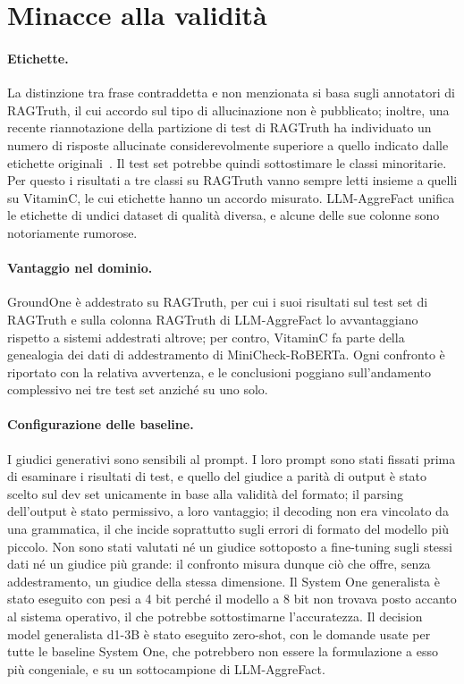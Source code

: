 \section{Minacce alla validità}
\label{sec:disc-threats}

\paragraph{Etichette.} La distinzione tra frase contraddetta e non menzionata si basa sugli annotatori di RAGTruth, il
cui accordo sul tipo di allucinazione non è pubblicato; inoltre, una recente riannotazione della partizione di test di
RAGTruth ha individuato un numero di risposte allucinate considerevolmente superiore a quello indicato dalle etichette
originali~\cite{yu2026retromorphic}. Il test set potrebbe quindi sottostimare le classi minoritarie. Per questo i
risultati a tre classi su RAGTruth vanno sempre letti insieme a quelli su VitaminC, le cui etichette hanno un accordo
misurato. LLM-AggreFact unifica le etichette di undici dataset di qualità diversa, e alcune delle sue colonne sono
notoriamente rumorose.

\paragraph{Vantaggio nel dominio.} GroundOne è addestrato su RAGTruth, per cui i suoi risultati sul test set di RAGTruth e
sulla colonna RAGTruth di LLM-AggreFact lo avvantaggiano rispetto a sistemi addestrati altrove; per contro, VitaminC fa
parte della genealogia dei dati di addestramento di MiniCheck-RoBERTa. Ogni confronto è riportato con la relativa
avvertenza, e le conclusioni poggiano sull'andamento complessivo nei tre test set anziché su uno solo.

\paragraph{Configurazione delle baseline.} I giudici generativi sono sensibili al prompt. I loro prompt sono stati
fissati prima di esaminare i risultati di test, e quello del giudice a parità di output è stato scelto sul dev set
unicamente in base alla validità del formato; il parsing dell'output è stato permissivo, a loro vantaggio; il decoding
non era vincolato da una grammatica, il che incide soprattutto sugli errori di formato del modello più piccolo. Non sono
stati valutati né un giudice sottoposto a fine-tuning sugli stessi dati né un giudice più grande: il confronto misura
dunque ciò che offre, senza addestramento, un giudice della stessa dimensione. Il System One generalista è stato eseguito
con pesi a 4 bit perché il modello a 8 bit non trovava posto accanto al sistema operativo, il che potrebbe sottostimarne
l'accuratezza. Il decision model generalista d1-3B è stato eseguito zero-shot, con le domande usate per tutte le baseline
System One, che potrebbero non essere la formulazione a esso più congeniale, e su un sottocampione di LLM-AggreFact.

